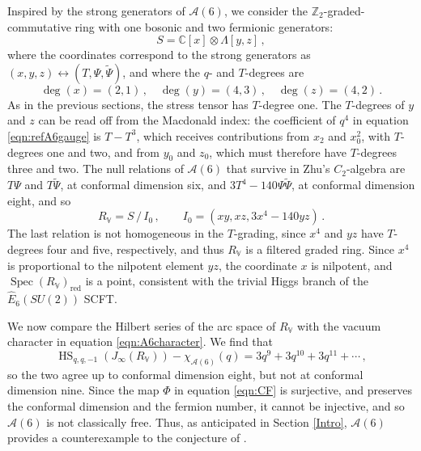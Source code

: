 \documentclass[12pt]{article}
\numberwithin{equation}{section}
\numberwithin{figure}{section}
\theoremstyle{plain}
\theoremstyle{definition}
\begin{document}
Inspired by the strong generators of $\mathcal{A}(6)$, we consider the $\mathbb{Z}_2$-graded-commutative ring with one bosonic and two fermionic generators:
\begin{equation}\label{eqn:A6S}
    S = \mathbb{C}[x] \otimes \Lambda[y, z] \,,
\end{equation}
where the coordinates correspond to the strong generators as $(x, y, z) \leftrightarrow (T, \Psi, \widetilde{\Psi})$, and where the $q$- and $T$-degrees are
\begin{equation}\label{eqn:A6gradings}
    \operatorname{deg}(x) = (2,1) \,, \quad \operatorname{deg}(y) = (4, 3) \,, \quad \operatorname{deg}(z) = (4,2) \,.
\end{equation}
As in the previous sections, the stress tensor has $T$-degree one. The $T$-degrees of $y$ and $z$ can be read off from the Macdonald index: the coefficient of $q^4$ in equation \eqref{eqn:refA6gauge} is $T - T^3$, which receives contributions from $x_2$ and $x_0^2$, with $T$-degrees one and two, and from $y_0$ and $z_0$, which must therefore have $T$-degrees three and two. The null relations of $\mathcal{A}(6)$ that survive in Zhu's $C_2$-algebra are $T\Psi$ and $T\widetilde{\Psi}$, at conformal dimension six, and $3T^4 - 140\Psi\widetilde{\Psi}$, at conformal dimension eight, and so
\begin{equation}\label{eqn:A6I0}
    R_\mathbb{V} = S \, / \, I_0 \,, \qquad I_0 = (xy, xz, 3x^4 - 140yz) \,.
\end{equation}
The last relation is not homogeneous in the $T$-grading, since $x^4$ and $yz$ have $T$-degrees four and five, respectively, and thus $R_\mathbb{V}$ is a filtered graded ring. Since $x^4$ is proportional to the nilpotent element $yz$, the coordinate $x$ is nilpotent, and $\operatorname{Spec}(R_\mathbb{V})_\text{red}$ is a point, consistent with the trivial Higgs branch of the $\widehat{E}_6(SU(2))$ SCFT.

We now compare the Hilbert series of the arc space of $R_\mathbb{V}$ with the vacuum character in equation \eqref{eqn:A6character}. We find that
\begin{equation}
    \operatorname{HS}_{q,q,-1}(J_\infty(R_\mathbb{V})) - \chi_{\mathcal{A}(6)}(q) = 3q^9 + 3q^{10} + 3q^{11} + \cdots \,,
\end{equation}
so the two agree up to conformal dimension eight, but not at conformal dimension nine. Since the map $\Phi$ in equation \eqref{eqn:CF} is surjective, and preserves the conformal dimension and the fermion number, it cannot be injective, and so $\mathcal{A}(6)$ is not classically free. Thus, as anticipated in Section \ref{Intro}, $\mathcal{A}(6)$ provides a counterexample to the conjecture of \cite{RastelliTalk1,RastelliTalk2}.
\end{document}
